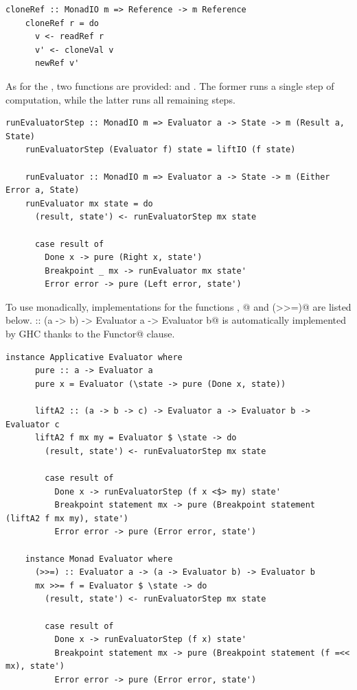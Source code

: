\documentclass[UdineBachThesis,american,11pt]{PhdThesis}
\begin{document}
  \pagebreak

  \begin{lstlisting}[gobble=4,basicstyle=\ttfamily\small]
    cloneRef :: MonadIO m => Reference -> m Reference
    cloneRef r = do
      v <- readRef r
      v' <- cloneVal v
      newRef v'
  \end{lstlisting}

  As for the \lstinline@Evaluator@, two functions are provided:
  \lstinline@runEvaluatorStep@ and \lstinline@runEvaluator@. The former runs a
  single step of computation, while the latter runs all remaining steps.

  \begin{lstlisting}[gobble=4,basicstyle=\ttfamily\small]
    runEvaluatorStep :: MonadIO m => Evaluator a -> State -> m (Result a, State)
    runEvaluatorStep (Evaluator f) state = liftIO (f state)

    runEvaluator :: MonadIO m => Evaluator a -> State -> m (Either Error a, State)
    runEvaluator mx state = do
      (result, state') <- runEvaluatorStep mx state

      case result of
        Done x -> pure (Right x, state')
        Breakpoint _ mx -> runEvaluator mx state'
        Error error -> pure (Left error, state')
  \end{lstlisting}

  To use \lstinline@Evaluator@s monadically, implementations for the functions
  \lstinline@pure@, @ and \lstinline@(>>=)@ are listed below.
  \lstinline@fmap :: (a -> b) -> Evaluator a -> Evaluator b@ is automatically
  implemented by GHC thanks to the \lstinline@deriving Functor@ clause.

  \begin{lstlisting}[gobble=4,basicstyle=\ttfamily\small]
    instance Applicative Evaluator where
      pure :: a -> Evaluator a
      pure x = Evaluator (\state -> pure (Done x, state))

      liftA2 :: (a -> b -> c) -> Evaluator a -> Evaluator b -> Evaluator c
      liftA2 f mx my = Evaluator $ \state -> do
        (result, state') <- runEvaluatorStep mx state

        case result of
          Done x -> runEvaluatorStep (f x <$> my) state'
          Breakpoint statement mx -> pure (Breakpoint statement (liftA2 f mx my), state')
          Error error -> pure (Error error, state')

    instance Monad Evaluator where
      (>>=) :: Evaluator a -> (a -> Evaluator b) -> Evaluator b
      mx >>= f = Evaluator $ \state -> do
        (result, state') <- runEvaluatorStep mx state

        case result of
          Done x -> runEvaluatorStep (f x) state'
          Breakpoint statement mx -> pure (Breakpoint statement (f =<< mx), state')
          Error error -> pure (Error error, state')
  \end{lstlisting}
\end{document}
